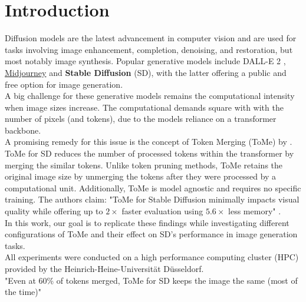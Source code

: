 \section{Introduction}
Diffusion models are the latest advancement in computer vision and are used for tasks involving image enhancement, completion, denoising, and restoration, but most notably image synthesis. Popular generative models include DALL-E 2 \cite{ramesh2022hierarchical}, \href{https://www.midjourney.com}{Midjourney} and \textbf{Stable Diffusion} (SD), with the latter offering a public and free option for image generation.\\
A big challenge for these generative models remains the computational intensity when image sizes increase. The computational demands square with with the number of pixels (and tokens), due to the models reliance on a transformer backbone.\\
A promising remedy for this issue is the concept of Token Merging (ToMe) by \cite{bolya2023tomesd}. ToMe for SD reduces the number of processed tokens within the transformer by merging the similar tokens. Unlike token pruning methods, ToMe retains the original image size by unmerging the tokens after they were processed by a computational unit. Additionally, ToMe is model agnostic and requires no specific training. The authors claim: "ToMe for Stable Diffusion minimally impacts visual quality while offering up to $2 \times$ faster evaluation using $5.6 \times$ less memory" \cite{bolya2023tomesd}.\\
In this work, our goal is to replicate these findings while investigating different configurations of ToMe and their effect on SD's performance in image generation tasks.\\


All experiments were conducted on a high performance computing cluster (HPC) provided by the Heinrich-Heine-Universität Düsseldorf.\\
"Even at 60\% of tokens merged, ToMe for SD keeps the image the same (most of the time)"